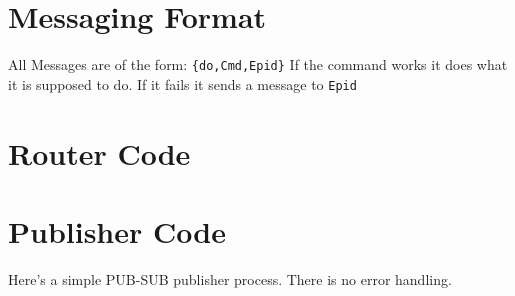 \documentclass[10pt]{article}
\begin{document}
\section{Messaging Format}

All Messages are of the form: \verb+{do,Cmd,Epid}+
If the command works it does what it is supposed to do. If it fails
it sends a message to \verb+Epid+

\section{Router Code}


\section{Publisher Code}

Here's a simple PUB-SUB publisher process. There is no error
handling.

\end{document}
